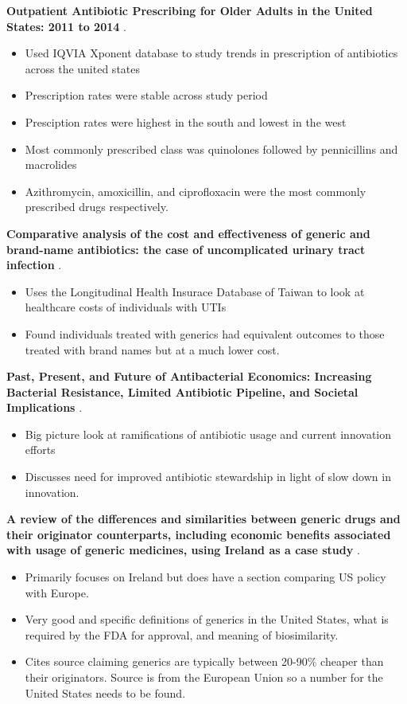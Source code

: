\noindent\textbf{Outpatient Antibiotic Prescribing for Older Adults in the United States: 2011 to 2014} \cite{kabbani_outpatient_2018}.\\
\begin{itemize}
    \item Used IQVIA Xponent database to study trends in prescription of antibiotics across the united states
    \item Prescription rates were stable across study period
    \item Presciption rates were highest in the south and lowest in the west
    \item Most commonly prescribed class was quinolones followed by pennicillins and macrolides
    \item Azithromycin, amoxicillin, and ciprofloxacin were the most commonly prescribed drugs respectively.
\end{itemize}

\noindent\textbf{Comparative analysis of the cost and effectiveness of generic and brand-name antibiotics: the case of uncomplicated urinary tract infection} \cite{lin_comparative_2017}.\\
\begin{itemize}
    \item Uses the Longitudinal Health Insurace Database of Taiwan to look at healthcare costs of individuals with UTIs
    \item Found individuals treated with generics had equivalent outcomes to those treated with brand names but at a much lower cost.
\end{itemize}

\noindent\textbf{Past, Present, and Future of Antibacterial Economics: Increasing Bacterial Resistance, Limited Antibiotic Pipeline, and Societal Implications} \cite{luepke_past_2017}.\\
\begin{itemize}
    \item Big picture look at ramifications of antibiotic usage and current innovation efforts
    \item Discusses need for improved antibiotic stewardship in light of slow down in innovation. 
\end{itemize}

\noindent\textbf{A review of the differences and similarities between generic drugs and their originator counterparts, including economic benefits associated with usage of generic medicines, using Ireland as a case study} \cite{dunne_review_2013}.\\
\begin{itemize}
    \item Primarily focuses on Ireland but does have a section comparing US policy with Europe.
    \item Very good and specific definitions of generics in the United States, what is required by the FDA for approval, and meaning of biosimilarity.
    \item Cites source claiming generics are typically between 20-90\% cheaper than their originators. Source is from the European Union so a number for the United States needs to be found. 
\end{itemize}

